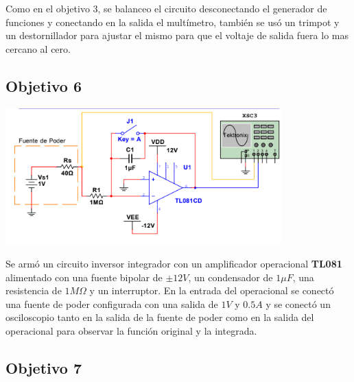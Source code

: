 \documentclass[DIV=calc, paper=a4, fontsize=11pt]{scrartcl}
\newenvironment{Figura}
  {\par\medskip\noindent\minipage{\linewidth}}
  {\endminipage\par\medskip}
\begin{document}
\begin{multicols}{2}
Como en el objetivo 3, se balanceo el circuito desconectando el generador de funciones y conectando en la salida el multímetro, también se usó un trimpot y un destornillador para ajustar el mismo para que el voltaje de salida fuera lo mas cercano al cero.

\subsection*{Objetivo 6}

\begin{Figura}
    \centering
    \includegraphics[width=0.8\textwidth]{diagramas/diagrama objetivo 4.PNG}
    \label{fig}
\end{Figura}

Se armó un circuito inversor integrador con un amplificador operacional \textbf{TL081} alimentado con una fuente bipolar de $\pm 12V$, un condensador de $1 \mu F$, una resistencia de $1 M \Omega$ y un interruptor. En la entrada del operacional se conectó una fuente de poder configurada con una salida de $1 V$ y $0.5 A$ y se conectó un osciloscopio tanto en la salida de la fuente de poder como en la salida del operacional para observar la función original y la integrada.

\subsection*{Objetivo 7}


\end{multicols}
\end{document}
